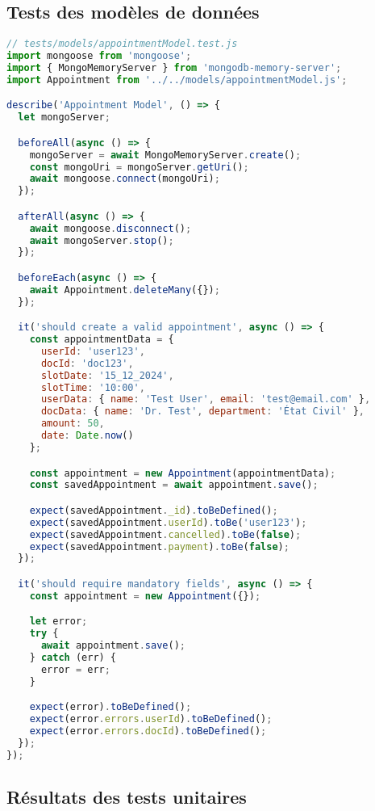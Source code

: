 \subsection{Tests des modèles de données}

\begin{lstlisting}[language=JavaScript, caption=Test du modèle Appointment]
// tests/models/appointmentModel.test.js
import mongoose from 'mongoose';
import { MongoMemoryServer } from 'mongodb-memory-server';
import Appointment from '../../models/appointmentModel.js';

describe('Appointment Model', () => {
  let mongoServer;

  beforeAll(async () => {
    mongoServer = await MongoMemoryServer.create();
    const mongoUri = mongoServer.getUri();
    await mongoose.connect(mongoUri);
  });

  afterAll(async () => {
    await mongoose.disconnect();
    await mongoServer.stop();
  });

  beforeEach(async () => {
    await Appointment.deleteMany({});
  });

  it('should create a valid appointment', async () => {
    const appointmentData = {
      userId: 'user123',
      docId: 'doc123',
      slotDate: '15_12_2024',
      slotTime: '10:00',
      userData: { name: 'Test User', email: 'test@email.com' },
      docData: { name: 'Dr. Test', department: 'État Civil' },
      amount: 50,
      date: Date.now()
    };

    const appointment = new Appointment(appointmentData);
    const savedAppointment = await appointment.save();

    expect(savedAppointment._id).toBeDefined();
    expect(savedAppointment.userId).toBe('user123');
    expect(savedAppointment.cancelled).toBe(false);
    expect(savedAppointment.payment).toBe(false);
  });

  it('should require mandatory fields', async () => {
    const appointment = new Appointment({});

    let error;
    try {
      await appointment.save();
    } catch (err) {
      error = err;
    }

    expect(error).toBeDefined();
    expect(error.errors.userId).toBeDefined();
    expect(error.errors.docId).toBeDefined();
  });
});
\end{lstlisting}

\subsection{Résultats des tests unitaires}

